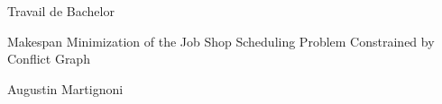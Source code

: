 \documentclass{mimosis}
\begin{document}

\begin{titlepage}


  	\begin{center}
		\vspace*{2cm}
  		\begin{huge}
  			Travail de Bachelor \\
  		\end{huge}

  		\vspace{1cm}
    
  		\begin{LARGE}
  			 Makespan Minimization of the Job Shop Scheduling Problem Constrained by Conflict Graph 
  		\vspace{0.5cm}
	\end{LARGE}
  	\end{center}

  	\begin{center}
  		\begin{Large}
  			Augustin Martignoni \\ 
  		\end{Large}
  		\vspace{1.5cm}
  		\date{}
  	\end{center}


\end{titlepage}
\end{document}
